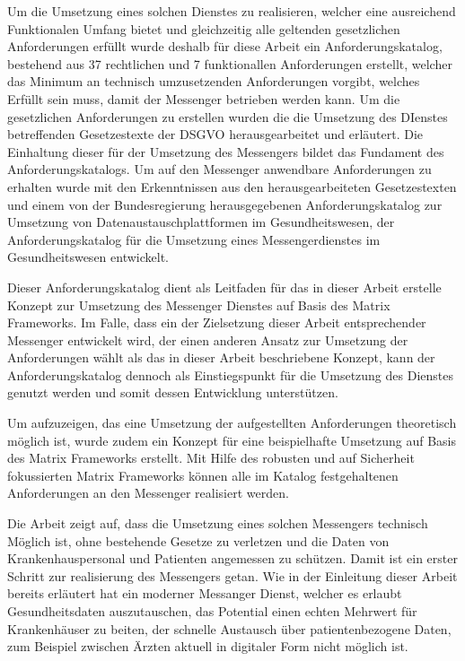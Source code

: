Um die Umsetzung eines solchen Dienstes zu realisieren, welcher eine ausreichend Funktionalen Umfang bietet und gleichzeitig alle geltenden gesetzlichen Anforderungen erfüllt wurde deshalb für diese Arbeit ein Anforderungskatalog, bestehend aus 37 rechtlichen und 7 funktionallen Anforderungen erstellt, welcher das Minimum an technisch umzusetzenden Anforderungen vorgibt, welches Erfüllt sein muss, damit der Messenger betrieben werden kann. Um die gesetzlichen Anforderungen zu erstellen wurden die die Umsetzung des DIenstes betreffenden Gesetzestexte der DSGVO herausgearbeitet und erläutert. Die Einhaltung dieser für der Umsetzung des Messengers bildet das Fundament des Anforderungskatalogs. Um auf den Messenger anwendbare Anforderungen zu erhalten wurde mit den Erkenntnissen aus den herausgearbeiteten Gesetzestexten und einem von der Bundesregierung herausgegebenen Anforderungskatalog zur Umsetzung von Datenaustauschplattformen im Gesundheitswesen, der Anforderungskatalog für die Umsetzung eines Messengerdienstes im Gesundheitswesen entwickelt.

Dieser Anforderungskatalog dient als Leitfaden für das in dieser Arbeit erstelle Konzept zur Umsetzung des Messenger Dienstes auf Basis des Matrix Frameworks. Im Falle, dass ein der Zielsetzung dieser Arbeit entsprechender Messenger entwickelt wird, der einen anderen Ansatz zur Umsetzung der Anforderungen wählt als das in dieser Arbeit beschriebene Konzept, kann der Anforderungskatalog dennoch als Einstiegspunkt für die Umsetzung des Dienstes genutzt werden und somit dessen Entwicklung unterstützen.

Um aufzuzeigen, das eine Umsetzung der aufgestellten Anforderungen theoretisch möglich ist, wurde zudem ein Konzept für eine beispielhafte Umsetzung auf Basis des Matrix Frameworks erstellt. Mit Hilfe des robusten und auf Sicherheit fokussierten Matrix Frameworks können alle im Katalog festgehaltenen Anforderungen an den Messenger realisiert werden. 

Die Arbeit zeigt auf, dass die Umsetzung eines solchen Messengers technisch Möglich ist, ohne bestehende Gesetze zu verletzen und die Daten von Krankenhauspersonal und Patienten angemessen zu schützen.
Damit ist ein erster Schritt zur realisierung des Messengers getan. Wie in der Einleitung dieser Arbeit bereits erläutert hat ein moderner Messanger Dienst, welcher es erlaubt Gesundheitsdaten auszutauschen, das Potential einen echten Mehrwert für Krankenhäuser zu beiten, der schnelle Austausch über patientenbezogene Daten, zum Beispiel zwischen Ärzten aktuell in digitaler Form nicht möglich ist. 


